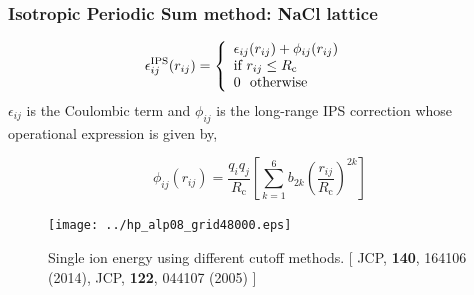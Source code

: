\documentclass{beamer}
\begin{document}
\begin{frame}\frametitle{Isotropic Periodic Sum method: NaCl lattice}

\fboxsep=0pt
\noindent %
\begin{minipage}[t]{0.48\linewidth}
 
\begin{equation}                                                                                                                                            
\label{Eq:ipspot}
\epsilon^{\text{IPS}}_{ij}(r_{ij})= \left\{ \begin{array}{l l} \epsilon _{ij}(r_{ij}) + \phi_{ij}(r_{ij}) & \quad \\
\text{if $r_{ij}\le R_\text{c}$ } & \quad \\ 0 \text{~~otherwise} & \quad \end{array} \right.
\end{equation}
$\epsilon_{ij}$ is the Coulombic term and $\phi_{ij}$ is the long-range
IPS correction  whose operational expression is given by, 
 
\begin{equation}
\label{Eq:ipslong}
\phi_{ij}(r_{ij}) = \frac{q_i q_j}{R_\text{c}} \left [ \sum^{6}_{k=1} b_{2k} \left ( \frac{r_{ij}}{R_\text{c}} \right )^{2k} \right ]
\end{equation}
\end{minipage}
\hfill%
\begin{minipage}[t]{0.48\linewidth}
\begin{figure}
\texttt{[image: ../hp\_alp08\_grid48000.eps]}
\caption{{\scriptsize Single ion energy using different cutoff methods. [ 
JCP, {\bf 140}, 164106 (2014), JCP, {\bf 122}, 044107 (2005) ] }}
\end{figure}
\end{minipage}
\end{frame}
\end{document}
